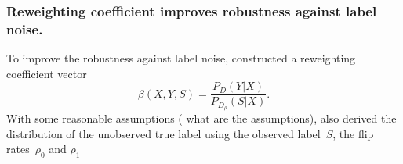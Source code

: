 \documentclass[12pt]{article} %
\begin{document}
\subsubsection{Reweighting coefficient improves robustness against label noise.}
To improve the robustness against label noise, \citet{liu2016classification} constructed a reweighting coefficient vector~
\begin{equation}
\beta(X,Y,S)=\frac{P_D(Y|X)}{P_{D_\rho}(S|X)}. \label{beta}
\end{equation}
With some reasonable assumptions ({\color{red} what are the assumptions}), \citet{liu2016classification} also derived the distribution of the unobserved  true label using the observed label~$S$, the flip rates~$\rho_{0}$ and $\rho_{1}$
\end{document}
